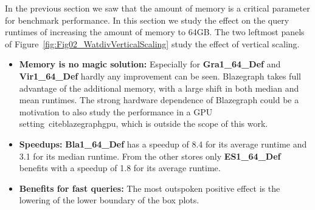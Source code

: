 %

%
%
In the previous section we saw that the amount of memory is a critical parameter for benchmark performance. 
In this section we study the effect on the query runtimes of increasing the amount of memory to 64GB.
The two leftmost panels of Figure~\ref{fig:Fig02_WatdivVerticalScaling} study the effect of vertical scaling. 
%



\begin{itemize}
	\item \textbf{Memory is no magic solution:} Especially for \textbf{Gra1\_64\_Def} and \textbf{Vir1\_64\_Def} hardly any improvement can be seen. Blazegraph takes full advantage of the additional memory, with a large shift in both median and mean runtimes. The strong hardware dependence of Blazegraph could be a motivation to also study the performance in a GPU setting~cite{blazegraphgpu}, which is outside the scope of this work.
	\item \textbf{Speedups:} \textbf{Bla1\_64\_Def} has a speedup of 8.4 for its average runtime and 3.1 for its median runtime. From the other stores only \textbf{ES1\_64\_Def} benefits with a speedup of 1.8 for its average runtime.
	\item \textbf{Benefits for fast queries:} The most outspoken positive effect is the lowering of the lower boundary of the box plots.  
\end{itemize}




